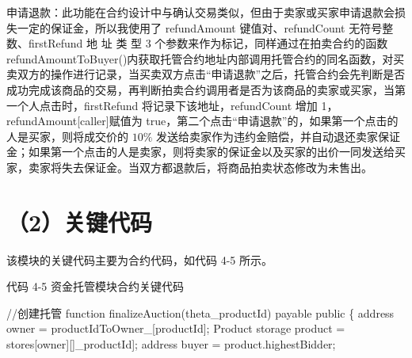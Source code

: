 \documentclass[
  10
]{article}
\newenvironment{Shaded}{}{}
\newcommand{\NormalTok}[1]{#1}
\begin{document}
申请退款：此功能在合约设计中与确认交易类似，但由于卖家或买家申请退款会损失一定的保证金，所以我使用了
refundAmount 键值对、refundCount 无符号整数、firstRefund 地 址 类 型 3
个参数来作为标记，同样通过在拍卖合约的函数refundAmountToBuyer()内获取托管合约地址内部调用托管合约的同名函数，对买卖双方的操作进行记录，当买卖双方点击``申请退款''之后，托管合约会先判断是否成功完成该商品的交易，再判断拍卖合约调用者是否为该商品的卖家或买家，当第一个人点击时，firstRefund
将记录下该地址，refundCount 增加 1，refundAmount{[}caller{]}赋值为
true，第二个点击``申请退款''的，如果第一个点击的人是买家，则将成交价的
\(10 \%\)
发送给卖家作为违约金赔偿，并自动退还卖家保证金；如果第一个点击的人是卖家，则将卖家的保证金以及买家的出价一同发送给买家，卖家将失去保证金。当双方都退款后，将商品拍卖状态修改为未售出。

\section{（2）关键代码}\label{ux5173ux952eux4ee3ux7801-4}

该模块的关键代码主要为合约代码，如代码 4-5 所示。

代码 4-5 资金托管模块合约关键代码

\begin{Shaded}
\begin{Highlighting}[]
\NormalTok{//创建托管  }
\NormalTok{function finalizeAuction(theta\_productId) payable public \{  }
\NormalTok{    address owner = productIdToOwner\_[productId];  }
\NormalTok{    Product storage product = stores[owner][]\_productId];  }
\NormalTok{    address buyer = product.highestBidder;}
\end{Highlighting}
\end{Shaded}
\end{document}
